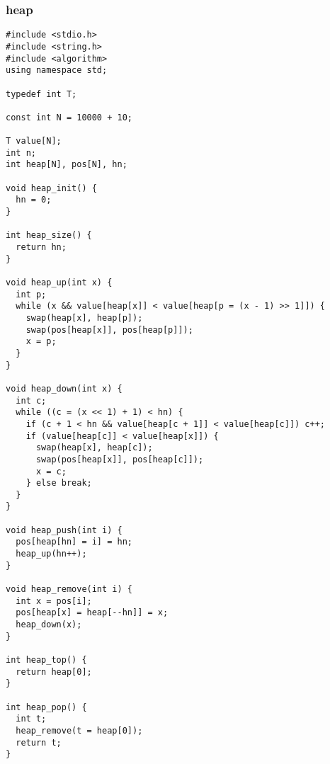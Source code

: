 \subsubsection{heap}
\begin{verbatim}
#include <stdio.h>
#include <string.h>
#include <algorithm>
using namespace std;

typedef int T;

const int N = 10000 + 10;

T value[N]; 
int n;
int heap[N], pos[N], hn;

void heap_init() {
  hn = 0;
}

int heap_size() {
  return hn;
}

void heap_up(int x) {
  int p;
  while (x && value[heap[x]] < value[heap[p = (x - 1) >> 1]]) {
    swap(heap[x], heap[p]);
    swap(pos[heap[x]], pos[heap[p]]);
    x = p;
  }
}

void heap_down(int x) {
  int c;
  while ((c = (x << 1) + 1) < hn) {
    if (c + 1 < hn && value[heap[c + 1]] < value[heap[c]]) c++;
    if (value[heap[c]] < value[heap[x]]) {
      swap(heap[x], heap[c]);
      swap(pos[heap[x]], pos[heap[c]]);
      x = c;
    } else break;
  }
}

void heap_push(int i) {
  pos[heap[hn] = i] = hn;
  heap_up(hn++);
}

void heap_remove(int i) {
  int x = pos[i];
  pos[heap[x] = heap[--hn]] = x;
  heap_down(x);
}

int heap_top() {
  return heap[0];
}

int heap_pop() {
  int t;
  heap_remove(t = heap[0]);
  return t;
}
\end{verbatim}
